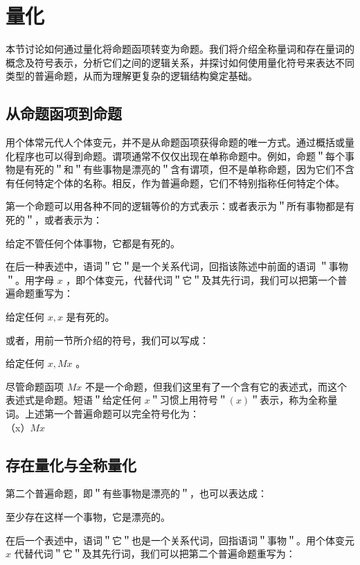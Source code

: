 \section{量化}

\begin{logicbox}[title=引言]
本节讨论如何通过量化将命题函项转变为命题。我们将介绍全称量词和存在量词的概念及符号表示，分析它们之间的逻辑关系，并探讨如何使用量化符号来表达不同类型的普遍命题，从而为理解更复杂的逻辑结构奠定基础。
\end{logicbox}

\subsection{从命题函项到命题}

用个体常元代人个体变元，并不是从命题函项获得命题的唯一方式。通过概括或量化程序也可以得到命题。谓项通常不仅仅出现在单称命题中。例如，命题＂每个事物是有死的＂和＂有些事物是漂亮的＂含有谓项，但不是单称命题，因为它们不含有任何特定个体的名称。相反，作为普遍命题，它们不特别指称任何特定个体。

第一个命题可以用各种不同的逻辑等价的方式表示：或者表示为＂所有事物都是有死的＂，或者表示为：

给定不管任何个体事物，它都是有死的。

在后一种表述中，语词＂它＂是一个关系代词，回指该陈述中前面的语词 ＂事物＂。用字母 $x$ ，即个体变元，代替代词＂它＂及其先行词，我们可以把第一个普遍命题重写为：

给定任何 $x, x$ 是有死的。

或者，用前一节所介绍的符号，我们可以写成：

给定任何 $x, M x$ 。

尽管命题函项 $M x$ 不是一个命题，但我们这里有了一个含有它的表述式，而这个表述式是命题。短语＂给定任何 $x$＂习惯上用符号＂$(x)$＂表示，称为全称量词。上述第一个普遍命题可以完全符号化为：\\
（x）$M x$

\subsection{存在量化与全称量化}

第二个普遍命题，即＂有些事物是漂亮的＂，也可以表达成：

至少存在这样一个事物，它是漂亮的。

在后一个表述中，语词＂它＂也是一个关系代词，回指语词＂事物＂。用个体变元 $x$ 代替代词＂它＂及其先行词，我们可以把第二个普遍命题重写为：

